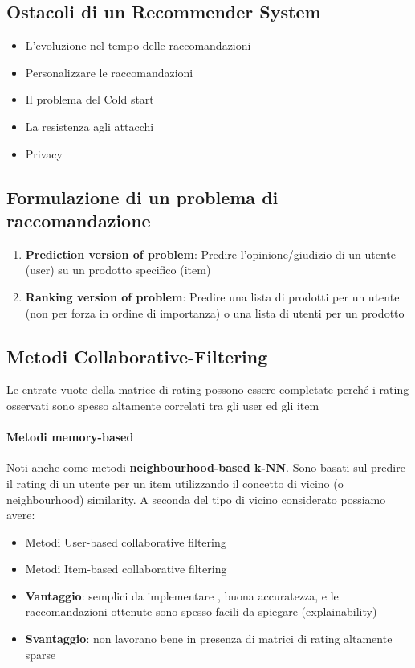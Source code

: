 \documentclass[12pt]{article}
\begin{document}
\subsection{Ostacoli di un Recommender System}
\begin{itemize}
    \item L’evoluzione nel tempo delle raccomandazioni
    \item Personalizzare le raccomandazioni
    \item Il problema del Cold start
    \item La resistenza agli attacchi
    \item Privacy
\end{itemize}
\subsection{Formulazione di un problema di raccomandazione}
\begin{enumerate}
    \item \textbf{Prediction version of problem}: Predire l’opinione/giudizio di un utente (user) su un prodotto specifico (item)
    \item \textbf{Ranking version of problem}: Predire una lista di prodotti per un utente (non per forza in ordine di importanza) o una lista di utenti per un prodotto
\end{enumerate}
\subsection{Metodi Collaborative-Filtering}
Le entrate vuote della matrice di rating possono essere completate perché i rating osservati sono spesso altamente correlati tra gli user ed gli item
\paragraph{Metodi memory-based}
Noti anche come metodi \textbf{neighbourhood-based k-NN}. Sono basati sul predire il rating di un utente per un item utilizzando il concetto di vicino (o neighbourhood) similarity.
A seconda del tipo di vicino considerato possiamo avere:
\begin{itemize}
    \item Metodi User-based collaborative filtering
    \item Metodi Item-based collaborative filtering
\end{itemize}
\begin{itemize}
    \item \textbf{Vantaggio}: semplici da implementare , buona accuratezza, e le raccomandazioni ottenute sono spesso facili da spiegare (explainability)
    \item \textbf{Svantaggio}: non lavorano bene in presenza di matrici di rating altamente sparse
\end{itemize}
\end{document}
